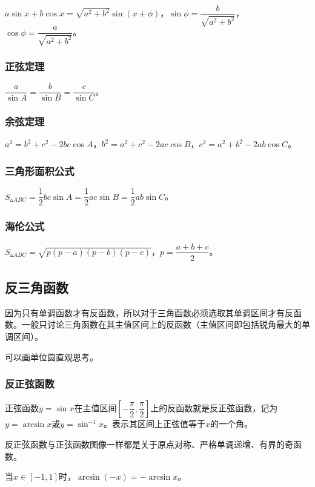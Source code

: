 \documentclass[UTF8, 12pt]{ctexart}
\begin{document}
$a\sin x+b\cos x=\sqrt{a^2+b^2}\sin(x+\phi)$，$\sin\phi=\dfrac{b}{\sqrt{a^2+b^2}}$，$\cos\phi=\dfrac{a}{\sqrt{a^2+b^2}}$。

\subsubsection{正弦定理}

$\dfrac{a}{\sin A}=\dfrac{b}{\sin B}=\dfrac{c}{\sin C}$。

\subsubsection{余弦定理}

$a^2=b^2+c^2-2bc\cos A$，$b^2=a^2+c^2-2ac\cos B$，$c^2=a^2+b^2-2ab\cos C$。

\subsubsection{三角形面积公式}

$S_{\vartriangle ABC}=\dfrac{1}{2}bc\sin A=\dfrac{1}{2}ac\sin B=\dfrac{1}{2}ab\sin C$。

\subsubsection{海伦公式}

$S_{\vartriangle ABC}=\sqrt{p(p-a)(p-b)(p-c)}$，$p=\dfrac{a+b+c}{2}$。

\subsection{反三角函数}

因为只有单调函数才有反函数，所以对于三角函数必须选取其单调区间才有反函数。一般只讨论三角函数在其主值区间上的反函数（主值区间即包括锐角最大的单调区间）。

可以画单位圆直观思考。

\subsubsection{反正弦函数}

正弦函数$y=\sin x$在主值区间$\left[-\dfrac{\pi}{2},\dfrac{\pi}{2}\right]$上的反函数就是反正弦函数，记为$y=\arcsin x$或$y=\sin^{-1}x$。表示其区间上正弦值等于$x$的一个角。

反正弦函数与正弦函数图像一样都是关于原点对称、严格单调递增、有界的奇函数。

当$x\in[-1,1]$时，$\arcsin(-x)=-\arcsin x$。
\end{document}

